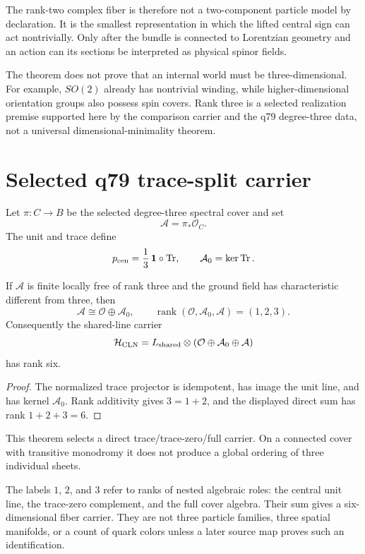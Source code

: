\documentclass[11pt]{article}
\begin{document}
The rank-two complex fiber is therefore not a two-component particle model by
declaration.  It is the smallest representation in which the lifted central
sign can act nontrivially.  Only after the bundle is connected to Lorentzian
geometry and an action can its sections be interpreted as physical spinor
fields.

The theorem does not prove that an internal world must be three-dimensional.
For example, $SO(2)$ already has nontrivial winding, while higher-dimensional
orientation groups also possess spin covers.  Rank three is a selected
realization premise supported here by the comparison carrier and the q79
degree-three data, not a universal dimensional-minimality theorem.

\section{Selected q79 trace-split carrier}

Let $\pi:C\to B$ be the selected degree-three spectral cover and set
\[
 \mathcal A=\pi_*\mathcal O_C.
\]
The unit and trace define
\[
 p_{\rm cen}=\frac13\,\mathbf1\circ\operatorname{Tr},
 \qquad
 \mathcal A_0=\ker\operatorname{Tr}.
\]

\begin{theorem}
If $\mathcal A$ is finite locally free of rank three and the ground field has
characteristic different from three, then
\[
 \mathcal A\cong\mathcal O\oplus\mathcal A_0,
 \qquad
 \operatorname{rank}(\mathcal O,\mathcal A_0,\mathcal A)=(1,2,3).
\]
Consequently the shared-line carrier
\[
 \mathcal H_{\rm CLN}
 =L_{\rm shared}\otimes
 (\mathcal O\oplus\mathcal A_0\oplus\mathcal A)
\]
has rank six.
\end{theorem}

\begin{proof}
The normalized trace projector is idempotent, has image the unit line, and has
kernel $\mathcal A_0$.  Rank additivity gives $3=1+2$, and the displayed
direct sum has rank $1+2+3=6$.
\end{proof}

This theorem selects a direct trace/trace-zero/full carrier.  On a connected
cover with transitive monodromy it does not produce a global ordering of three
individual sheets.

The labels $1$, $2$, and $3$ refer to ranks of nested algebraic roles:
the central unit line, the trace-zero complement, and the full cover algebra.
Their sum gives a six-dimensional fiber carrier.  They are not three particle
families, three spatial manifolds, or a count of quark colors unless a later
source map proves such an identification.
\end{document}

